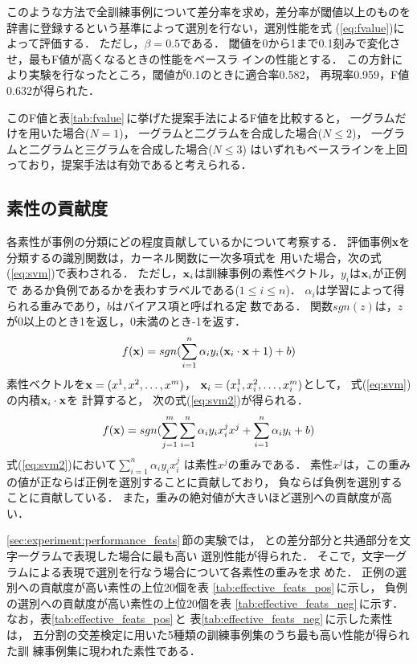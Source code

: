 このような方法で全訓練事例について差分率を求め，差分率が閾値以上のものを
辞書に登録するという基準によって選別を行ない，選別性能を式
(\ref{eq:fvalue})によって評価する．
ただし，$\beta=0.5$である．
閾値を0から1まで0.1刻みで変化させ，最もF値が高くなるときの性能をベースラ
インの性能とする．
この方針により実験を行なったところ，閾値が0.1のときに適合率0.582，
再現率0.959，F値0.632が得られた．

このF値と表\ref{tab:fvalue}\,に挙げた提案手法によるF値を比較すると，
一グラムだけを用いた場合($N = 1$)，
一グラムと二グラムを合成した場合($N \le 2$)，
一グラムと二グラムと三グラムを合成した場合($N \le 3$)
はいずれもベースラインを上回っており，提案手法は有効であると考えられる．


\subsection{素性の貢献度}

各素性が事例の分類にどの程度貢献しているかについて考察する．
評価事例{\bf x}を分類する{\SVM}の識別関数は，カーネル関数に一次多項式を
用いた場合，次の式(\ref{eq:svm})で表わされる\cite{Tsuda03}．
ただし，${\bf x}_i$は訓練事例の素性ベクトル，$y_i$は${\bf x}_i$が正例で
あるか負例であるかを表わすラベルである($1 \le i \le n$)．
$\alpha_i$は学習によって得られる重みであり，$b$はバイアス項と呼ばれる定
数である．
関数$sgn(z)$は，$z$が0以上のとき1を返し，0未満のとき-1を返す．
\begin{equation}
f({\bf x})=sgn(\displaystyle\sum_{i=1}^{n}
\alpha_i y_i ({\bf x}_i\cdot{\bf x}+1)+b)
\label{eq:svm}
\end{equation}
素性ベクトルを${\bf x} = (x^1, x^2, \ldots, x^m)$，
${\bf x}_i = (x_i^1, x_i^2, \ldots, x_i^m)$として，
式(\ref{eq:svm})の内積${\bf x}_i\cdot{\bf x}$を
計算すると，
次の式(\ref{eq:svm2})が得られる． 
\begin{equation}
f({\bf x})=sgn(\displaystyle\sum_{j=1}^{m}\sum_{i=1}^{n}\alpha_i y_i 
x_i^j x^j + \displaystyle\sum_{i=1}^{n}\alpha_i y_i +b)
\label{eq:svm2}
\end{equation}
式(\ref{eq:svm2})において$\displaystyle\sum_{i=1}^{n}\alpha_i y_i x_i^j$
は素性$x^j$の重みである．
素性$x^j$は，この重みの値が正ならば正例を選別することに貢献しており，
負ならば負例を選別することに貢献している．
また，重みの絶対値が大きいほど選別への貢献度が高い．

\ref{sec:experiment:performance_feats}\,節の実験では，
{\CT}と{\NT}の差分部分と共通部分を文字一グラムで表現した場合に最も高い
選別性能が得られた．
そこで，文字一グラムによる表現で選別を行なう場合について各素性の重みを求
めた．
正例の選別への貢献度が高い素性の上位20個を表
\ref{tab:effective_feats_pos}\,に示し，
負例の選別への貢献度が高い素性の上位20個を表
\ref{tab:effective_feats_neg}\,に示す．
なお，表\ref{tab:effective_feats_pos}\,と
表\ref{tab:effective_feats_neg}\,に示した素性は，
五分割の交差検定に用いた5種類の訓練事例集のうち最も高い性能が得られた訓
練事例集に現われた素性である．

